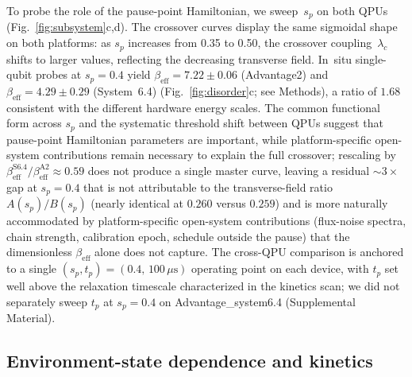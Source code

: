 \documentclass[aps,prapplied,reprint,superscriptaddress,floatfix,nofootinbib]{revtex4-2}
\begin{document}
To probe the role of the pause-point Hamiltonian, we sweep~$s_p$ on both QPUs (Fig.~\ref{fig:subsystem}c,d).
The crossover curves display the same sigmoidal shape on both platforms: as $s_p$ increases from 0.35 to 0.50, the crossover coupling~$\lambda_c$ shifts to larger values, reflecting the decreasing transverse field.
In~situ single-qubit probes at $s_p=0.4$ yield $\beta_\mathrm{eff}=7.22\pm 0.06$ (Advantage2) and $\beta_\mathrm{eff}=4.29\pm 0.29$ (System~6.4) (Fig.~\ref{fig:disorder}c; see Methods), a ratio of $1.68$ consistent with the different hardware energy scales.
The common functional form across $s_p$ and the systematic threshold shift between QPUs suggest that pause-point Hamiltonian parameters are important, while platform-specific open-system contributions remain necessary to explain the full crossover; rescaling by $\beta_\mathrm{eff}^{\mathrm{S6.4}}/\beta_\mathrm{eff}^{\mathrm{A2}}\approx 0.59$ does not produce a single master curve, leaving a residual $\sim 3\times$ gap at $s_p=0.4$ that is not attributable to the transverse-field ratio $A(s_p)/B(s_p)$ (nearly identical at $0.260$ versus $0.259$) and is more naturally accommodated by platform-specific open-system contributions (flux-noise spectra, chain strength, calibration epoch, schedule outside the pause) that the dimensionless $\beta_\mathrm{eff}$ alone does not capture.
The cross-QPU comparison is anchored to a single $(s_p,t_p)=(0.4,\,100\,\mu\mathrm{s})$ operating point on each device, with $t_p$ set well above the relaxation timescale characterized in the kinetics scan; we did not separately sweep $t_p$ at $s_p=0.4$ on Advantage\_system6.4 (Supplemental Material).

\subsection{Environment-state dependence and kinetics}
\end{document}
